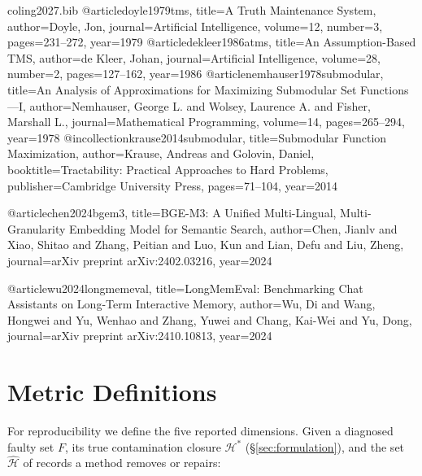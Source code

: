 \documentclass[11pt]{article}
\theoremstyle{remark}
\begin{document}
\begin{filecontents}{coling2027.bib}
@article{doyle1979tms,
  title={A Truth Maintenance System},
  author={Doyle, Jon},
  journal={Artificial Intelligence}, volume={12}, number={3}, pages={231--272}, year={1979}
}
@article{dekleer1986atms,
  title={An Assumption-Based {TMS}},
  author={de Kleer, Johan},
  journal={Artificial Intelligence}, volume={28}, number={2}, pages={127--162}, year={1986}
}
@article{nemhauser1978submodular,
  title={An Analysis of Approximations for Maximizing Submodular Set Functions---{I}},
  author={Nemhauser, George L. and Wolsey, Laurence A. and Fisher, Marshall L.},
  journal={Mathematical Programming}, volume={14}, pages={265--294}, year={1978}
}
@incollection{krause2014submodular,
  title={Submodular Function Maximization},
  author={Krause, Andreas and Golovin, Daniel},
  booktitle={Tractability: Practical Approaches to Hard Problems},
  publisher={Cambridge University Press}, pages={71--104}, year={2014}
}

@article{chen2024bgem3,
  title={{BGE-M3}: A Unified Multi-Lingual, Multi-Granularity Embedding Model for Semantic Search},
  author={Chen, Jianlv and Xiao, Shitao and Zhang, Peitian and Luo, Kun and Lian, Defu and Liu, Zheng},
  journal={arXiv preprint arXiv:2402.03216}, year={2024}
}

@article{wu2024longmemeval,
  title={{LongMemEval}: Benchmarking Chat Assistants on Long-Term Interactive Memory},
  author={Wu, Di and Wang, Hongwei and Yu, Wenhao and Zhang, Yuwei and Chang, Kai-Wei and Yu, Dong},
  journal={arXiv preprint arXiv:2410.10813}, year={2024}
}
\end{filecontents}



\appendix
\section{Metric Definitions}
\label{sec:metrics}

For reproducibility we define the five reported dimensions. Given a diagnosed faulty set
$F$, its true contamination closure $\mathcal{H}^{*}$ (\S\ref{sec:formulation}), and the
set $\hat{\mathcal{H}}$ of records a method removes or repairs:
\end{document}
